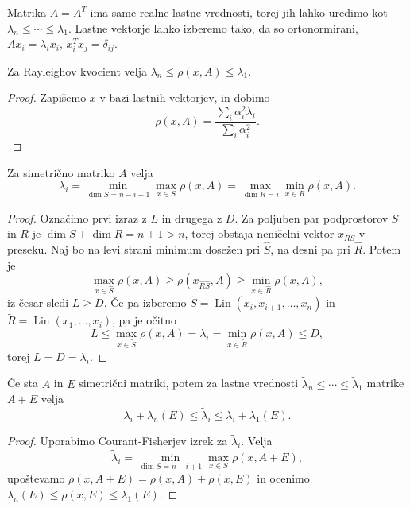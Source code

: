 
Matrika $A = A^T$ ima same realne lastne vrednosti, torej jih lahko uredimo kot
$\lambda_n \le \cdots \le \lambda_1$.
Lastne vektorje lahko izberemo tako, da so ortonormirani, $A x_i = \lambda_i
x_i$, $x_i^T x_j = \delta_{ij}$.

\begin{lema}
  Za Rayleighov kvocient velja $\lambda_n \le \rho(x, A) \le \lambda_1$.
\end{lema}

\begin{proof}
  Zapišemo $x$ v bazi lastnih vektorjev, in dobimo
  \[
	\rho(x, A) = \frac{\sum_i \alpha_i^2 \lambda_i}{\sum_i \alpha_i^2}.
  \]
\end{proof}

\begin{izrek}
  Za simetrično matriko $A$ velja
  \[
	\lambda_i = \min_{\dim S = n-i+1} \max_{x \in S} \rho(x, A)
	= \max_{\dim R = i} \min_{x \in R} \rho(x, A).
  \]
\end{izrek}

\begin{proof}
  Označimo prvi izraz z $L$ in drugega z $D$.
  Za poljuben par podprostorov $S$ in $R$ je $\dim S + \dim R = n+1 > n$, torej
  obstaja neničelni vektor $x_{RS}$ v preseku.
  Naj bo na levi strani minimum dosežen pri $\hat{S}$, na desni pa pri
  $\hat{R}$.
  Potem je
  \[
	\max_{x \in \hat{S}} \rho(x, A) \ge \rho(x_{\hat{R} \hat{S}}, A) \ge \min_{x
	\in \hat{R}} \rho(x, A),
  \]
  iz česar sledi $L \ge D$.
  Če pa izberemo $\tilde{S} = \operatorname{Lin}(x_i, x_{i+1}, \ldots, x_n)$ in
  $\tilde{R} = \operatorname{Lin}(x_1, \ldots, x_i)$, pa je očitno
  \[
	L \le \max_{x \in \tilde{S}} \rho(x, A) = \lambda_i = \min_{x \in \tilde{R}}
	\rho(x, A) \le D,
  \]
  torej $L = D = \lambda_i$.
\end{proof}


\begin{posledica}
  Če sta $A$ in $E$ simetrični matriki, potem za lastne vrednosti
  $\tilde{\lambda}_n \le \cdots \le \tilde{\lambda}_1$ matrike $A + E$ velja
  \[
	\lambda_i + \lambda_n(E) \le \tilde{\lambda}_i \le \lambda_i + \lambda_1(E).
  \]
\end{posledica}

\begin{proof}
  Uporabimo Courant-Fisherjev izrek za $\tilde{\lambda}_i$.
  Velja
  \[
	\tilde{\lambda}_i = \min_{\dim S = n-i+1} \max_{x \in S} \rho(x, A+E),
  \]
  upoštevamo $\rho(x, A+E) = \rho(x, A) + \rho(x, E)$ in ocenimo $\lambda_n(E)
  \le \rho(x, E) \le \lambda_1(E)$.
\end{proof}

